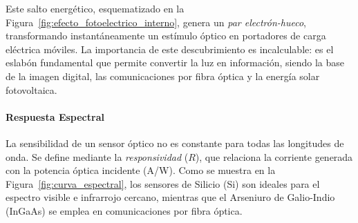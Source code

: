 Este salto energético, esquematizado en la Figura~\ref{fig:efecto_fotoelectrico_interno}, genera un \emph{par electrón-hueco}, transformando instantáneamente un estímulo óptico en portadores de carga eléctrica móviles. La importancia de este descubrimiento es incalculable: es el eslabón fundamental que permite convertir la luz en información, siendo la base de la imagen digital, las comunicaciones por fibra óptica y la energía solar fotovoltaica.

\paragraph{Respuesta Espectral}
La sensibilidad de un sensor óptico no es constante para todas las longitudes de onda. Se define mediante la \emph{responsividad} ($R$), que relaciona la corriente generada con la potencia óptica incidente (\unit{A/W}). Como se muestra en la Figura~\ref{fig:curva_espectral}, los sensores de Silicio (Si) son ideales para el espectro visible e infrarrojo cercano, mientras que el Arseniuro de Galio-Indio (InGaAs) se emplea en comunicaciones por fibra óptica.


